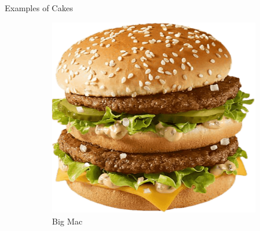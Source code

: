 \documentclass{beamer}
\begin{document}
\begin{frame}{Examples of Cakes}
    \begin{figure}
        \begin{subfigure}{.35\textwidth}
          \centering
          \includegraphics[width=\linewidth]{cake/33_big_mac.png}
          \caption{\label{fig:big-mac}Big Mac\texttrademark}
        \end{subfigure}
        \begin{subfigure}{.35\textwidth}
          \centering

\end{subfigure}
\end{figure}
\end{frame}
\end{document}
